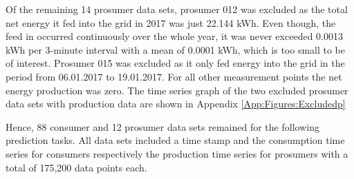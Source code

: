Of the remaining 14 prosumer data sets, prosumer 012 was excluded as the total net energy it fed into the grid in 2017 was just 22.144 kWh. Even though, the feed in occurred continuously over the whole year, it was never exceeded 0.0013 kWh per 3-minute interval with a mean of 0.0001 kWh, which is too small to be of interest. Prosumer 015 was excluded as it only fed energy into the grid in the period from 06.01.2017 to 19.01.2017. For all other measurement points the net energy production was zero. The time series graph of the two excluded prosumer data sets with production data are shown in Appendix \ref{App:Figures:Excludedp}

Hence, 88 consumer and 12 prosumer data sets remained for the following prediction tasks. All data sets included a time stamp and the consumption time series for consumers respectively the production time series for prosumers with a total of 175,200 data points each.


